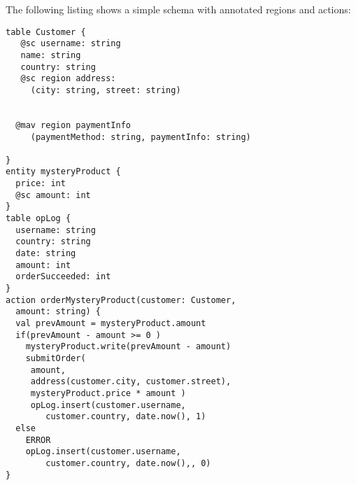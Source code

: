 \documentclass[preprint, numbers]{sigplanconf}
\begin{document}
The following listing shows a simple schema with annotated regions and actions:
\begin{lstlisting}[basicstyle=\small]
table Customer {
   @sc username: string
   name: string 
   country: string
   @sc region address: 
     (city: string, street: string)
     
   
  @mav region paymentInfo 
     (paymentMethod: string, paymentInfo: string)

}
entity mysteryProduct {
  price: int
  @sc amount: int
}
table opLog {
  username: string
  country: string
  date: string
  amount: int
  orderSucceeded: int
}
action orderMysteryProduct(customer: Customer,
  amount: string) {
  val prevAmount = mysteryProduct.amount
  if(prevAmount - amount >= 0 )
    mysteryProduct.write(prevAmount - amount)
    submitOrder(
     amount, 
     address(customer.city, customer.street), 
     mysteryProduct.price * amount )
     opLog.insert(customer.username, 
        customer.country, date.now(), 1)
  else 
    ERROR
    opLog.insert(customer.username, 
        customer.country, date.now(),, 0)
}
\end{lstlisting}
\end{document}
